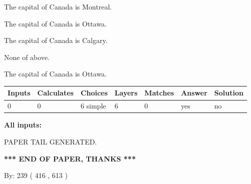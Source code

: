 \documentclass[12pt]{article}
\begin{document}
 
The capital of Canada is Montreal.
 
 
The capital of Canada is Ottawa.
 
 
The capital of Canada is Calgary.
 
 
 None of above.
 
 
\noindent{}
 
 
The capital of Canada is Ottawa.
 
 
\noindent{}
 
 
   
   
   
   
\noindent\begin{tabular}{|l|l|l|l|l|l|l|}
 \hline
Inputs & Calculates & Choices & Layers & Matches & Answer & Solution \\ \hline
 0  & 
 0  & 
 6
  simple  
  & 
 6  & 
 0  & 
  yes & 
  no 
  \\ \hline
 \end{tabular}
   
   
   
   
\noindent{}
   
   
   
   
\noindent\vspace{0.1in}\hspace{-0.08in} {\textbf{\Large{All inputs: }}}
   
   
   
   
   
   
 \vspace{0.2in}
 
   
   
\vspace{2.0in} PAPER TAIL GENERATED.
   
   
   
   
\vspace{1.0in} 
{\textbf{\large{ *** END OF PAPER, THANKS *** }}} 
   
   
\hspace{1.0in} By: 
 239 ( 416 ,  613 )
   
   
   
   
\newpage 
\setcounter{page}{ 
   573001 } 
   
\end{document}
